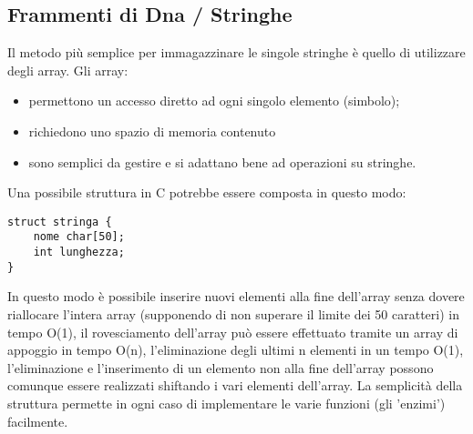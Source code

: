 \documentclass[a4paper,10pt]{article}
\begin{document}
\subsection{Frammenti di Dna / Stringhe}\label{sec:fram}
Il metodo più semplice per immagazzinare le singole stringhe è quello di utilizzare degli array. Gli array:
\begin{itemize}
\item permettono un accesso diretto ad ogni singolo elemento (simbolo);
\item richiedono uno spazio di memoria contenuto
\item sono semplici da gestire e si adattano bene ad operazioni su stringhe. 
\end{itemize}
Una possibile struttura in C potrebbe essere composta in questo modo:
\begin{verbatim}
struct stringa {
    nome char[50];
    int lunghezza;
}
\end{verbatim} In questo modo è possibile inserire nuovi elementi alla fine dell'array senza dovere riallocare l'intera array (supponendo di non superare il limite dei 50 caratteri) in tempo O(1), il rovesciamento dell'array può essere effettuato tramite un array di appoggio in tempo O(n), l'eliminazione degli ultimi n elementi in un tempo O(1), l'eliminazione e l'inserimento di un elemento non alla fine dell'array possono comunque essere realizzati shiftando i vari elementi dell'array. La semplicità della struttura permette in ogni caso di implementare le varie funzioni (gli 'enzimi') facilmente.
\end{document}
